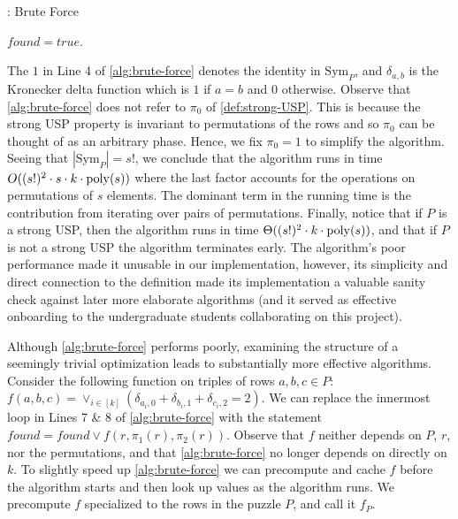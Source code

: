 \documentclass[11pt]{article}
\newcommand\Sym[1]{\ensuremath{\mathrm{Sym}_{#1}}}
\begin{document}
\begin{algorithm}[t]
  \caption{: Brute Force}
  \label{alg:brute-force}
\begin{algorithmic}[1]
  \For{$\pi_1 \in \Sym{P}$}
    \For{$\pi_2 \in \Sym{P}$}
             $found = true$. \EndIf
          \EndFor
        \EndFor
          \EndIf
      \EndIf
    \EndFor
  \EndFor
  \EndFunction
\end{algorithmic}
\end{algorithm}

The $1$ in Line 4 of \autoref{alg:brute-force} denotes the
identity in $\Sym{P}$, and $\delta_{a,b}$ is the Kronecker delta
function which is $1$ if $a = b$ and $0$ otherwise.  Observe that
\autoref{alg:brute-force} does not refer to $\pi_0$ of
\autoref{def:strong-USP}.  This is because the strong USP property is
invariant to permutations of the rows and so $\pi_0$ can be thought of
as an arbitrary phase.  Hence, we fix $\pi_0 = 1$ to simplify the
algorithm.  Seeing that $|\Sym{P}| = s!$, we conclude that the algorithm
runs in time $O((s!)^2 \cdot s \cdot k \cdot \operatorname{poly}(s))$ where the last
factor accounts for the operations on permutations of
$s$ elements.  The dominant term in the running time is the
contribution from iterating over pairs of permutations.
Finally, notice that if $P$ is a strong USP, then the algorithm runs
in time $\Theta((s!)^2 \cdot k \cdot \operatorname{poly}(s))$, and that if $P$ is
not a strong USP the algorithm terminates early.  The algorithm's
poor performance made it unusable in our
implementation, however, its simplicity and direct connection to the
definition made its implementation a valuable sanity check against
later more elaborate algorithms (and it served as effective onboarding to
the undergraduate students collaborating on this project).

Although \autoref{alg:brute-force} performs poorly, examining the
structure of a seemingly trivial optimization leads to substantially
more effective algorithms. Consider the following function on triples
of rows $a, b, c \in P$: $f(a,b,c) = \vee_{i \in [k]} (\delta_{a_i,0} +
\delta_{b_i,1} + \delta_{c_i,2} = 2).$ We can replace the innermost
loop in Lines 7 \& 8 of \autoref{alg:brute-force} with the statement
$found = found \vee f(r, \pi_1(r), \pi_2(r))$.  Observe that $f$
neither depends on $P$, $r$, nor the permutations, and that
\autoref{alg:brute-force} no longer depends on directly on $k$.  To
slightly speed up \autoref{alg:brute-force} we can precompute and
cache $f$ before the algorithm starts and then look up values as the
algorithm runs.  We precompute $f$ specialized to the rows in the
puzzle $P$, and call it $f_P$.
\end{document}
